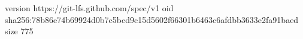 version https://git-lfs.github.com/spec/v1
oid sha256:78b86e74b69924d0b7c5bcd9c15d5602f66301b6463c6afdbb3633e2fa91baed
size 775
